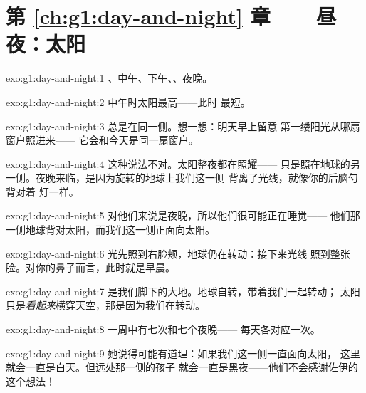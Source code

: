 \section*{第 \ref{ch:g1:day-and-night} 章——昼夜：太阳}

\begin{solution}{exo:g1:day-and-night:1}
、中午、下午、、夜晚。
\end{solution}

\begin{solution}{exo:g1:day-and-night:2}
中午时太阳最高——此时
最短。
\end{solution}

\begin{solution}{exo:g1:day-and-night:3}
总是在同一侧。想一想：明天早上留意
第一缕阳光从哪扇窗户照进来——
它会和今天是同一扇窗户。
\end{solution}

\begin{solution}{exo:g1:day-and-night:4}
这种说法不对。太阳整夜都在照耀——
只是照在地球的另一侧。夜晚来临，是因为旋转的地球上我们这一侧
背离了光线，就像你的后脑勺背对着
灯一样。
\end{solution}

\begin{solution}{exo:g1:day-and-night:5}
对他们来说是夜晚，所以他们很可能正在睡觉——
他们那一侧地球背对太阳，而我们这一侧正面向太阳。
\end{solution}

\begin{solution}{exo:g1:day-and-night:6}
光先照到右脸颊，地球仍在转动：接下来光线
照到整张脸。对你的鼻子而言，此时就是早晨。
\end{solution}

\begin{solution}{exo:g1:day-and-night:7}
是我们脚下的大地。地球自转，带着我们一起转动；
太阳只是\emph{看起来}横穿天空，那是因为我们在转动。
\end{solution}

\begin{solution}{exo:g1:day-and-night:8}
一周中有七次和七个夜晚——
每天各对应一次。
\end{solution}

\begin{solution}{exo:g1:day-and-night:9}
她说得可能有道理：如果我们这一侧一直面向太阳，
这里就会一直是白天。但远处那一侧的孩子
就会一直是黑夜——他们不会感谢佐伊的这个想法！
\end{solution}

